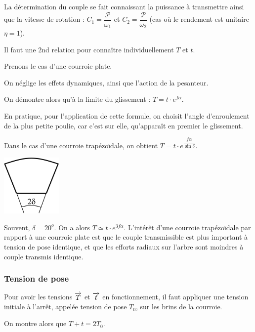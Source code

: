 \documentclass[11pt,oneside]{article}
\begin{document}
La détermination du couple se fait connaissant la puissance à transmettre ainsi que la vitesse de rotation :
$C_1 = \dfrac{\mathcal{P}}{\omega_1}$ et  $C_2 = \dfrac{\mathcal{P}}{\omega_2}$  (cas où le rendement est unitaire $\eta = 1$).

Il faut une 2nd relation pour connaître individuellement $T$ et $t$.

Prenons le cas d’une courroie plate.

On néglige les effets dynamiques, ainsi que l’action de la pesanteur.

On démontre alors qu’à la limite du glissement :  $T=t\cdot e^{f\alpha}$.


En pratique, pour l’application de cette formule, on choisit l’angle d’enroulement de la plus petite poulie, car c’est sur elle, qu’apparaît en premier le glissement.

Dans le cas d’une courroie trapézoïdale, on obtient  $T=t\cdot e^{\dfrac{f\alpha}{\sin \delta}}$.

\begin{minipage}[c]{.25\linewidth}
\begin{center}
\includegraphics[height=3cm]{png/fig_45}
\end{center}
\end{minipage} \hfill
\begin{minipage}[c]{.7\linewidth}
Souvent, $\delta=20^o$. On a alors $T\simeq t\cdot e^{3f\alpha}$.
L’intérêt d’une courroie trapézoïdale par rapport à une courroie plate est que le couple transmissible est plus important à tension de pose identique, et que les efforts radiaux sur l’arbre sont moindres à couple transmis identique.

\end{minipage} 

\subsubsection{Tension de pose}
Pour avoir les tensions $\overrightarrow{T}$ et $\overrightarrow{t}$ en fonctionnement, il faut appliquer une tension initiale à l’arrêt, appelée tension de pose $T_0$, sur les brins de la courroie.

On montre alors que  $T+t=2T_0$.
\end{document}
